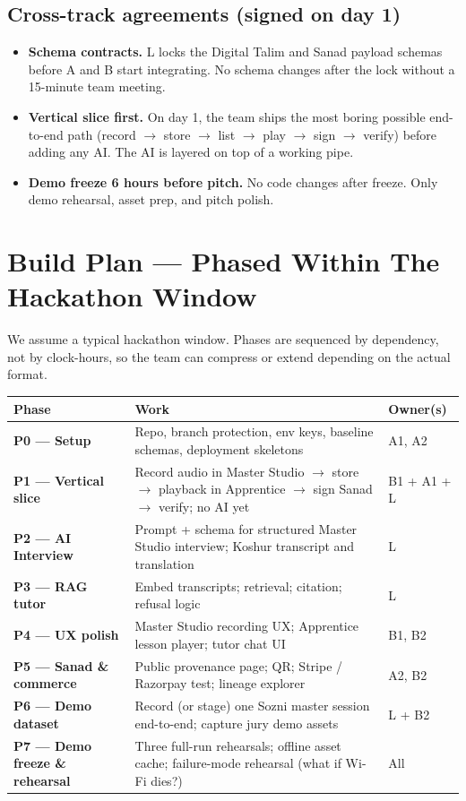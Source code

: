 \documentclass[11pt, a4paper]{article}
\begin{document}
\subsection{Cross-track agreements (signed on day 1)}

\begin{itemize}
  \item \textbf{Schema contracts.} L locks the Digital Talim and Sanad payload schemas before A and B start integrating. No schema changes after the lock without a 15-minute team meeting.
  \item \textbf{Vertical slice first.} On day 1, the team ships the most boring possible end-to-end path (record $\to$ store $\to$ list $\to$ play $\to$ sign $\to$ verify) before adding any AI. The AI is layered on top of a working pipe.
  \item \textbf{Demo freeze 6 hours before pitch.} No code changes after freeze. Only demo rehearsal, asset prep, and pitch polish.
\end{itemize}

\section{Build Plan — Phased Within The Hackathon Window}

We assume a typical hackathon window. Phases are sequenced by dependency, not by clock-hours, so the team can compress or extend depending on the actual format.

\begin{center}
\small
\begin{tabularx}{\linewidth}{>{\bfseries}lXX}
\toprule
Phase & Work & Owner(s) \\
\midrule
P0 — Setup & Repo, branch protection, env keys, baseline schemas, deployment skeletons & A1, A2 \\
P1 — Vertical slice & Record audio in Master Studio $\to$ store $\to$ playback in Apprentice $\to$ sign Sanad $\to$ verify; no AI yet & B1 + A1 + L \\
P2 — AI Interview & Prompt + schema for structured Master Studio interview; Koshur transcript and translation & L \\
P3 — RAG tutor & Embed transcripts; retrieval; citation; refusal logic & L \\
P4 — UX polish & Master Studio recording UX; Apprentice lesson player; tutor chat UI & B1, B2 \\
P5 — Sanad \& commerce & Public provenance page; QR; Stripe / Razorpay test; lineage explorer & A2, B2 \\
P6 — Demo dataset & Record (or stage) one Sozni master session end-to-end; capture jury demo assets & L + B2 \\
P7 — Demo freeze \& rehearsal & Three full-run rehearsals; offline asset cache; failure-mode rehearsal (what if Wi-Fi dies?) & All \\
\bottomrule
\end{tabularx}
\end{center}
\end{document}

